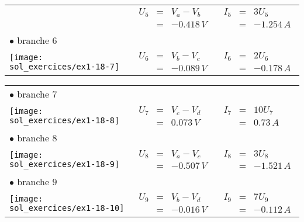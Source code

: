 \begin{tabular}{lll}
	& $\begin{array}{rcl}
	U_{5} &=& V_a-V_b\\ &=& -0.418\, V \end{array}$
	& $\begin{array}{rcl}
	I_{5} &=& 3U_{5} \\ &=& -1.254\, A \end{array}$ \\[14mm]
	$\bullet$ branche 6 & & \\
	\parbox[c]{4cm}{\texttt{[image: sol\_exercices/ex1-18-7]}}
	& $\begin{array}{rcl}
	U_{6} &=& V_b-V_c \\ &=& -0.089\, V \end{array}$
	& $\begin{array}{rcl}
	I_{6} &=& 2U_{6} \\ &=& -0.178\, A \end{array}$ 
\end{tabular}

\begin{tabular}{lll}
	$\bullet$ branche 7 & & \\
	\parbox[c]{4cm}{\texttt{[image: sol\_exercices/ex1-18-8]}}
	& $\begin{array}{rcl}
	U_{7} &=& V_c-V_d \\ &=& 0.073\, V \end{array}$
	& $\begin{array}{rcl}
	I_{7} &=& 10U_{7} \\ &=& 0.73\, A \end{array}$ \\[20mm]
	$\bullet$ branche 8 & & \\
	\parbox[c]{4cm}{\texttt{[image: sol\_exercices/ex1-18-9]}}
	& $\begin{array}{rcl}
	U_{8} &=& V_a-V_c \\ &=& -0.507\, V \end{array}$
	& $\begin{array}{rcl}
	I_{8} &=& 3U_{8} \\ &=& -1.521\, A \end{array}$ \\[20mm]
	$\bullet$ branche 9 & & \\
	\parbox[c]{4cm}{ \texttt{[image: sol\_exercices/ex1-18-10]}}
	& $\begin{array}{rcl}
	U_{9} &=& V_b-V_d \\ &=& -0.016\, V \end{array}$
	& $\begin{array}{rcl}
	I_{9} &=& 7U_{9} \\ &=& -0.112\, A \end{array}$
\end{tabular}

